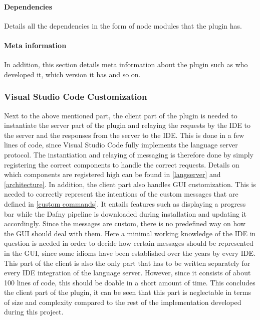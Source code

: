 \paragraph{Dependencies}
Details all the dependencies in the form of node modules that the plugin has.

\paragraph{Meta information}
In addition, this section details meta information about the plugin such as who developed it, which version it has and so on.

\subsubsection{Visual Studio Code Customization}
Next to the above mentioned part, the client part of the plugin is needed to instantiate the server part of the plugin and relaying the requests by the IDE to the server and the responses from the server to the IDE. This is done in a few lines of code, since Visual Studio Code fully implements the language server protocol. The instantiation and relaying of messaging is therefore done by simply registering the correct components to handle the correct requests. Details on which components are registered high can be found in \ref{langserver} and \ref{architecture}.\newline
In addition, the client part also handles GUI customization. This is needed to correctly represent the intentions of the custom messages that are defined in \ref{custom commands}. It entails features such as displaying a progress bar while the Dafny pipeline is downloaded during installation and updating it accordingly. Since the messages are custom, there is no predefined way on how the GUI should deal with them. Here a minimal working knowledge of the IDE in question is needed in order to decide how certain messages should be represented in the GUI, since some idioms have been established over the years by every IDE. \newline
This part of the client is also the only part that has to be written separately for every IDE integration of the language server. However, since it consists of about 100 lines of code, this should be doable in a short amount of time. This concludes the client part of the plugin, it can be seen that this part is neglectable in terms of size and complexity compared to the rest of the implementation developed during this project. 

